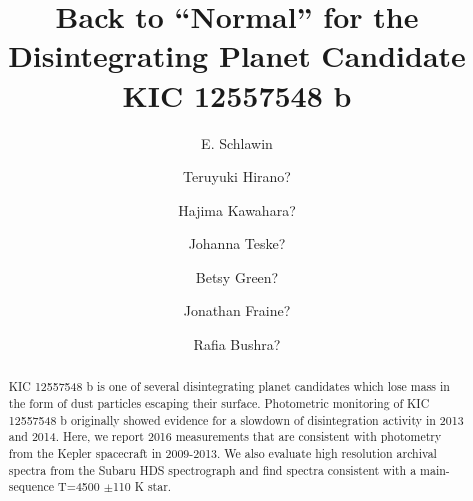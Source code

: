 \documentclass[preprint]{aastex61}
\begin{document}
\title{Back to ``Normal'' for the Disintegrating Planet Candidate KIC 12557548 b}



\author{E. Schlawin}


\author{Teruyuki Hirano?}

\author{Hajima Kawahara?}

\author{Johanna Teske?}

\author{Betsy Green?}

\author{Jonathan Fraine?}

\author{Rafia Bushra?}

\begin{abstract}
KIC 12557548 b is one of several disintegrating planet candidates which lose mass in the form of dust particles escaping their surface.
Photometric monitoring of KIC 12557548 b originally showed evidence for a slowdown of disintegration activity in 2013 and 2014.
Here, we report 2016 measurements that are consistent with photometry from the Kepler spacecraft in 2009-2013.
We also evaluate high resolution archival spectra from the Subaru HDS spectrograph and find spectra consistent with a main-sequence T=4500 $\pm$110 K star.
\end{abstract}


\end{document}
